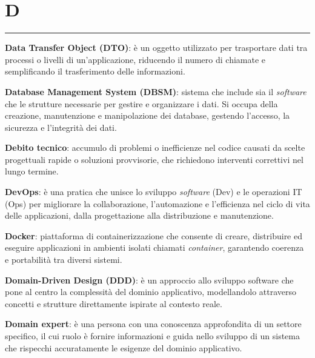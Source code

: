 \section*{D}
{\color{lightgray}\rule{\textwidth}{0.4pt}} %
\begin{glossaryitemize}
    \item \textbf{Data Transfer Object (DTO)}:  è un oggetto utilizzato per trasportare dati tra processi o livelli di un’applicazione, riducendo il numero di chiamate e semplificando il trasferimento delle informazioni.
    \item \textbf{Database Management System (DBSM)}: sistema che include sia il \textit{software} che le strutture necessarie per gestire e organizzare i dati. Si occupa della creazione, manutenzione e manipolazione dei database, gestendo l'accesso, la sicurezza e l'integrità dei dati.
    \item \textbf{Debito tecnico}: accumulo di problemi o inefficienze nel codice causati da scelte progettuali rapide o soluzioni provvisorie, che richiedono interventi correttivi nel lungo termine.
    \item \textbf{DevOps}: è una pratica che unisce lo sviluppo \textit{software} (Dev) e le operazioni IT (Ops) per migliorare la collaborazione, l'automazione e l'efficienza nel ciclo di vita delle applicazioni, dalla progettazione alla distribuzione e manutenzione.
    \item \textbf{Docker}: piattaforma di containerizzazione che consente di creare, distribuire ed eseguire applicazioni in ambienti isolati chiamati \textit{container}, garantendo coerenza e portabilità tra diversi sistemi.
    \item \textbf{Domain-Driven Design (DDD)}: è un approccio allo sviluppo software che pone al centro la complessità del dominio applicativo, modellandolo attraverso concetti e strutture direttamente ispirate al contesto reale.
    \item \textbf{Domain expert}: è una persona con una conoscenza approfondita di un settore specifico, il cui ruolo è fornire informazioni e guida nello sviluppo di un sistema che rispecchi accuratamente le esigenze del dominio applicativo.
\end{glossaryitemize}

